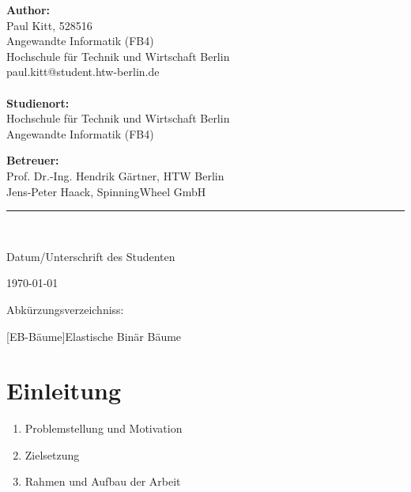 \documentclass[a4paper,11pt,oneside,%
headsepline,												%
footsepline,												%
bibtotocnumbered									%
]{scrreprt}
\newcommand{\HRule}{\rule{\linewidth}{0.5mm}}
\begin{document}
\begin{titlepage}
\begin{center}
		\begin{minipage}{0.4\textwidth}
			\begin{flushleft} \large
				\textbf{Author:}\\
				Paul Kitt, 528516 \\
				Angewandte Informatik (FB4) \\	
				Hochschule für Technik und Wirtschaft Berlin\\
				paul.kitt@student.htw-berlin.de	\\~\\
				\textbf{Studienort:}	\\
				Hochschule für Technik und Wirtschaft Berlin \\
				Angewandte Informatik (FB4) \\
			\end{flushleft}
		\end{minipage}
		\begin{minipage}{0.4\textwidth}
			\begin{flushright} \large
				\textbf{Betreuer:} \\
				Prof. Dr.-Ing. Hendrik Gärtner, HTW Berlin \\
				Jens-Peter Haack,  SpinningWheel GmbH
			\end{flushright}
		\end{minipage}	
		\vfill
		\HRule \\
		\begin{minipage}{0.4\textwidth}
			\begin{flushright} \large
				Datum/Unterschrift des Studenten
			\end{flushright}
		\end{minipage}
		\vfill
		{\large \today}
	\end{center}
\end{titlepage}
\tableofcontents
\newpage
Abkürzungsverzeichniss:\\
\begin{acronym}[EB-Baum] %
 	[EB-Bäume]{Elastische Binär Bäume}
\end{acronym}
\renewcommand\listoflistingscaption{Verzeichnis aller Codebeispiele}
\listoflistings

\chapter{Einleitung}
 		\begin{enumerate}[1.]
			\item  Problemstellung und Motivation
			\item Zielsetzung
			\item Rahmen und Aufbau der Arbeit
		\end{enumerate}
		
\end{document}
